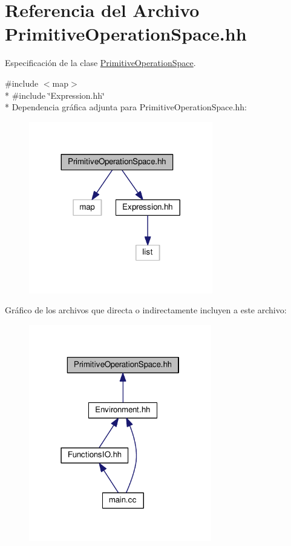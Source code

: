 \hypertarget{_primitive_operation_space_8hh}{}\section{Referencia del Archivo Primitive\+Operation\+Space.\+hh}
\label{_primitive_operation_space_8hh}


Especificación de la clase \hyperlink{class_primitive_operation_space}{Primitive\+Operation\+Space}.  


{\ttfamily \#include $<$map$>$}\\*
{\ttfamily \#include \char`\"{}Expression.\+hh\char`\"{}}\\*
Dependencia gráfica adjunta para Primitive\+Operation\+Space.\+hh\+:
\nopagebreak
\begin{figure}[H]
\begin{center}
\leavevmode
\includegraphics[width=227pt]{_primitive_operation_space_8hh__incl}
\end{center}
\end{figure}
Gráfico de los archivos que directa o indirectamente incluyen a este archivo\+:
\nopagebreak
\begin{figure}[H]
\begin{center}
\leavevmode
\includegraphics[width=226pt]{_primitive_operation_space_8hh__dep__incl}
\end{center}
\end{figure}
